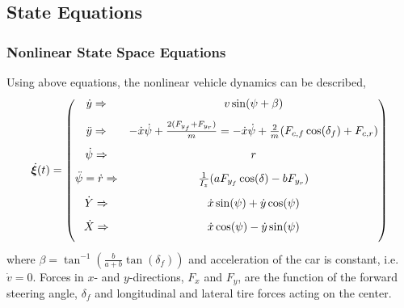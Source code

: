 \documentclass{beamer}
\begin{document}
\subsection{State Equations}
\begin{frame}
	\frametitle{Nonlinear State Space Equations}
	Using above equations, the nonlinear vehicle dynamics can be described,
	\begin{equation}
	\label{eqn:dynamic_and_kinematic_equations}
	\dot{\bm{\xi}}(t) = \begin{pmatrix}
	\dot{y} \Rightarrow& v\sin(\psi + \beta)\vspace{3mm}\\
	\ddot{y} \Rightarrow& -\dot{x}\dot{\psi} + \frac{2(F_{y_{f}}+F_{y_{r}})}{m} \vspace{3mm} = -\dot{x}\dot{\psi} + \frac{2}{m}(F_{c,f}\cos(\delta_{f})+F_{c,r})\\
	\dot{\psi} \Rightarrow& r \vspace{3mm}\\
	\ddot{\psi}=\dot{r} \Rightarrow& \frac{1}{I_z}(a{F}_{y_f}\cos(\delta)-b{F}_{y_r}) \vspace{3mm}\\
	\dot{Y} \Rightarrow& \dot{x}\sin(\psi) + \dot{y}\cos(\psi) \vspace{3mm}\\
	\dot{X} \Rightarrow& \dot{x}\cos(\psi) - \dot{y}\sin(\psi) \vspace{3mm}\\
	\end{pmatrix}  
	\end{equation}
	where $\beta = \tan^{-1}(\frac{b}{a+b}\tan(\delta_{f}))$ and acceleration of the car is constant, i.e. $\dot{v} = 0$. Forces in $x$- and $y$-directions, $F_x$ and $F_y$, are the function of the forward steering angle, $\delta_{f}$ and longitudinal and lateral tire forces acting on the center.
\end{frame}
\end{document}
